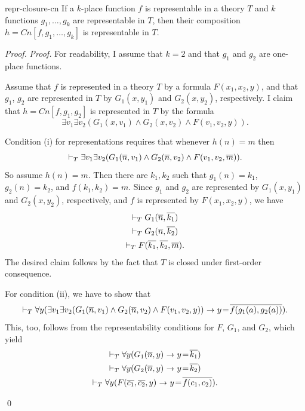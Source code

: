 \begin{lemma}{}{repr-closure-cn}
  If a $k$-place function $f$ is representable in a theory $T$
  and $k$ functions $g_{1},\ldots,g_{k}$ are representable in $T$,
  then their composition $h = Cn[f,g_{1},\ldots,g_{k}]$ is representable in $T$.
\end{lemma}
\begin{proof}
  \emph{Proof.}
  For readability, I assume that $k=2$ and that $g_{1}$ and $g_{2}$ are one-place functions.

  Assume that $f$ is represented in a theory $T$ by a formula $F(x_{1},x_{2},y)$,
  and that $g_{1}$, $g_{2}$ are represented in $T$ by $G_{1}(x,y_{1})$ and $G_{2}(x,y_{2})$,
  respectively.
  I claim that $h = Cn[f,g_{1},g_{2}]$ is represented in $T$ by the formula
  \[
    \exists v_{1}\exists v_{2}(G_{1}(x,v_{1}) \land G_{2}(x,v_{2}) \land F(v_{1},v_{2},y)).
  \]

  Condition (i) for representations requires that whenever $h(n) = m$ then
  \[
    \vdash_{T} \exists v_{1}\exists v_{2}(G_{1}(\overline{n},v_{1}) \land G_{2}(\overline{n},v_{2}) \land F(v_{1},v_{2},\overline{m})).
  \]
  So assume $h(n) = m$.
  Then there are $k_{1},k_{2}$ such that
  $g_{1}(n) = k_{1}$, $g_{2}(n) = k_{2}$, and $f(k_{1},k_{2}) = m$.
  Since $g_{1}$ and $g_{2}$ are represented by $G_{1}(x,y_{1})$ and $G_{2}(x,y_{2})$,
  respectively,
  and $f$ is represented by $F(x_{1},x_{2},y)$,
  we have
  \begin{gather*}
    \vdash_{T} G_{1}(\overline{n},\overline{k_{1}}) \\
    \vdash_{T} G_{2}(\overline{n},\overline{k_{2}}) \\
    \vdash_{T} F(\overline{k_{1}},\overline{k_{2}},\overline{m}).
  \end{gather*}
  The desired claim follows by the fact that $T$ is closed under first-order consequence.

  For condition (ii),
  we have to show that
  \[
    \proves_{T} \forall y(\exists v_{1}\exists v_{2}(G_{1}(\num{n},v_{1}) \land G_{2}(\num{n},v_{2}) \land F(v_{1},v_{2},y)) \,\to\, y\!=\!\num{f(g_{1}(a),g_{2}(a))}).
  \]
  This, too, follows from the representability conditions for $F$, $G_{1}$, and $G_{2}$,
  which yield
  \begin{gather*}
    \proves_{T} \forall y(G_{1}(\num{n},y) \,\to\, y\!=\!\num{k_{1}}) \\
    \proves_{T} \forall y(G_{2}(\num{n},y) \,\to\, y\!=\!\num{k_{2}}) \\
    \proves_{T} \forall y(F(\num{c_{1}},\num{c_{2}},y) \,\to\, y\!=\!\num{f(c_{1},c_{2})}).
  \end{gather*}
  \vspace{-3\baselineskip}
  
  \qed
\end{proof}

